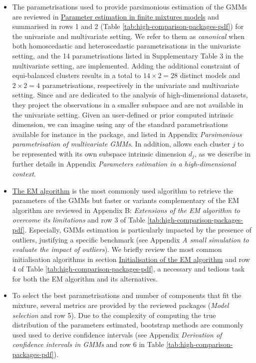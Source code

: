 \begin{itemize}
\item
  The parametrisations used to provide parsimonious estimation of the GMMs are reviewed in \protect\hyperlink{parameter-estimation-in-finite-mixtures-models}{Parameter estimation in finite mixtures models} and summarised in rows 1 and 2 (Table \ref{tab:high-comparison-packages-pdf}) for the univariate and multivariate setting. We refer to them as \emph{canonical} when both homoscedastic and heteroscedastic parametrisations in the univariate setting, and the 14 parametrisations listed in Supplementary Table 3 in the multivariate setting, are implemented. Adding the additional constraint of equi-balanced clusters results in a total to \(14 \times 2=28\) distinct models and \(2 \times 2=4\) parametrisations, respectively in the univariate and multivariate setting. Since  and  are dedicated to the analysis of high-dimensional datasets, they project the observations in a smaller subspace and are not available in the univariate setting. Given an user-defined or prior computed intrinsic dimension, we can imagine using any of the standard parametrisations available for instance in the  package, and listed in Appendix \emph{Parsimonious parametrisation of multivariate GMMs}. In addition,  allows each cluster \(j\) to be represented with its own subspace intrinsic dimension \(d_j\), as we describe in further details in Appendix \emph{Parameters estimation in a high-dimensional context}.
\item
  \protect\hyperlink{the-em-algorithm}{The EM algorithm} is the most commonly used
  algorithm to retrieve the parameters of the GMMs but faster or variants complementary of the EM algorithm are reviewed in Appendix B: \emph{Extensions of the EM algorithm to overcome its limitations} and row 3 of Table \ref{tab:high-comparison-packages-pdf}. Especially, GMMs estimation is particularly impacted by the presence of outliers, justifying a specific benchmark (see Appendix \emph{A small simulation to evaluate the impact of outliers}).
  We briefly review the most common initialisation algorithms in section \protect\hyperlink{initialisation-of-the-em-algorithm}{Initialisation of the EM algorithm} and row 4 of Table \ref{tab:high-comparison-packages-pdf}, a necessary and tedious task for both the EM algorithm and its alternatives.
\item
  To select the best parametrisations and number of components that fit the mixture, several metrics are provided by the reviewed packages (\emph{Model selection} and row 5). Due to the complexity of computing the true distribution of the parameters estimated, bootstrap methods are commonly used used to derive confidence intervals (see Appendix \emph{Derivation of confidence intervals in GMMs} and row 6 in Table \ref{tab:high-comparison-packages-pdf}).
\end{itemize}

